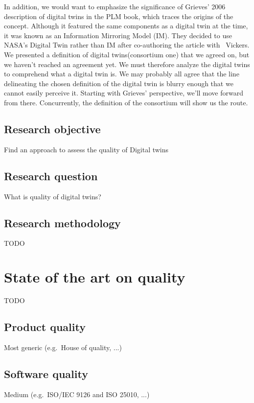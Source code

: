\documentclass[9pt,conference]{IEEEtran}
\begin{document}
    In addition, we would want to emphasize the significance of Grieves' 2006 description of digital twins in the PLM book, which traces the origins of the concept. Although it featured the same components as a digital twin at the time, it was known as an Information Mirroring Model (IM). They decided to use NASA's Digital Twin rather than IM after co-authoring the article with  Vickers.
    We presented a definition of digital twins(consortium one) that we agreed on, but we haven't reached an agreement yet. We must therefore analyze the digital twins to comprehend what a digital twin is. We may probably all agree that the line delineating the chosen definition of the digital twin is blurry enough that we cannot easily perceive it. Starting with Grieves' perspective, we'll move forward from there. Concurrently, the definition of the consortium will show us the route.

    \subsection{Research objective}
    Find an approach to assess the quality of Digital twins~\cite{Jones2020}

    \subsection{Research question}\label{section: Research Questions}
    What is quality of digital twins?

    \subsection{Research methodology}
    TODO

    \section{State of the art on quality}
    TODO

    \subsection{Product quality}
    Most generic (e.g.~House of quality, ...)

    \subsection{Software quality}
    Medium (e.g.~ISO/IEC 9126 and ISO 25010, ...)
\end{document}
